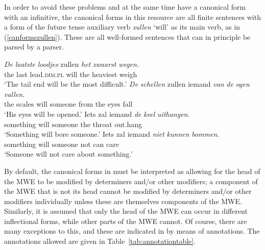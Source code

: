 \documentclass[output=paper,colorlinks,citecolor=brown]{langscibook}
\begin{document}
In order to avoid these problems and at the same time have a canonical form with an infinitive, the canonical forms in this resource are all finite sentences with a form of the future tense auxiliary verb \textit{zullen} `will' as its main verb, as in (\ref{canformszullen}). These are all well-formed sentences that can in principle be parsed by a parser.

\begin{exe}
\ex \label{canformszullen}
\begin{xlist}
\ex \gll \textit{De} \textit{laatste} \textit{loodjes} zullen \textit{het} \textit{zwaarst} \textit{wegen.}\\
the last lead.\textsc{dim}.\textsc{pl} will the heaviest weigh\\
\glt `The tail end will be the most difficult.'
\ex\gll \textit{De} \textit{schellen} zullen iemand \textit{van} \textit{de} \textit{ogen} \textit{vallen}.\\
the scales will someone from the eyes fall\\
\glt `His eyes will be opened.' 
\ex\gll Iets zal iemand \textit{de} \textit{keel} \textit{uithangen}.\\
             something will someone the throat out.hang\\  \label{ietssubject1}
        \glt `Something will bore someone.'
\ex\gll Iets zal iemand \textit{niet} \textit{kunnen} \textit{bommen}.\\
      something will someone not can care\\  \label{ietssubject2}
      \glt `Someone will not care about something.'
\end{xlist}
\end{exe}

By default, the canonical forms in {\DUCAME} must be interpreted as allowing for the head of the  MWE to be modified by determiners and/or other modifiers; a component of the MWE that is not its head cannot be modified by determiners and/or other modifiers individually unless these are themselves components of the MWE.
Similarly, it is assumed that only the head of the MWE can occur in different inflectional forms, while other parts of the MWE cannot. Of course, there are many exceptions to this, and these are indicated in {\DUCAME} by means of annotations. The annotations allowed are given in Table~\ref{tab:annotationtable}.
\end{document}
